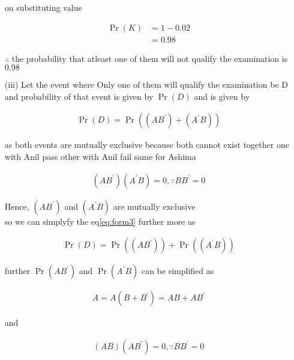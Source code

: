 \documentclass[journal,12pt,twocolumn]{IEEEtran}
\providecommand{\brak}[1]{\ensuremath{\left(#1\right)}}
\providecommand{\pr}[1]{\ensuremath{\Pr\left(#1\right)}}
\begin{document}
\begin{enumerate}
    on substituting value 
    
          \begin{align}
               \pr{K} &= 1 - 0.02  \\
                      &= 0.98 
          \end{align}
    
    $\therefore$ the probability that atleast one of them will not qualify the examination is $0.98$
    
    
    
    
    \item[(iii)] Let the event where Only one of them will qualify the examination be D and probability of that event is given by $\pr{D}$  and is given by
    
           \begin{align}
               \label{eq:form3}
               \pr{D} = \pr{\brak{A B^{\prime}} + \brak{A^{\prime} B}}   
           \end{align}
    
    as both events are mutually exclusive because both cannot exist together one with Anil pass other with Anil fail same for Ashima 
    
            \begin{align}
                \brak{A B^{\prime}}\brak{A^{\prime} B} = 0, \because BB^{\prime} = 0
                \label{eq:axiom_sum_AB}
            \end{align}
            
    Hence, $ \brak{A B^{\prime}} $ and $ \brak{A^{\prime} B}  $ are mutually exclusive \\  
    so we can simplyfy the eq\eqref{eq:form3} further more as  
    
            \begin{align}
                     \label{eq:form6}
                     \pr{D} = \pr{\brak{A B^{\prime}}} + \pr{\brak{A^{\prime} B}}
            \end{align}
    
    further $ \pr{A B^{\prime}} $ and $ \pr{A^{\prime} B} $ can be simplified as
    
            \begin{align}
                  A = A \brak{B+B^{\prime}} =  AB + AB^{\prime}
                 \label{eq:axiom_sum_A}
            \end{align}
    
    and 
    
            \begin{align}
                  \brak{ AB}\brak{  AB^{\prime}} = 0, \because BB^{\prime} = 0
                  \label{eq:axiom_sum_ABP}
                  \end{align}
                  

\end{enumerate}
\end{document}
